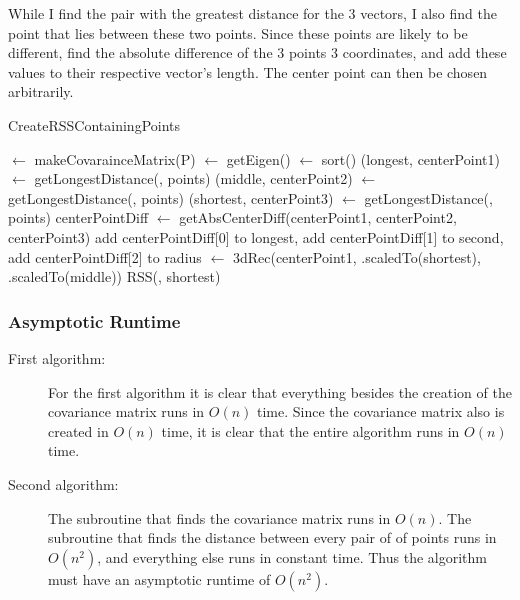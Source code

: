 While I find the pair with the greatest distance for the 3 vectors, I also find the point that lies between these two points. Since these points are likely to be different, find the absolute difference of the 3 points 3 coordinates, and add these values to their respective vector's length. The center point can then be chosen arbitrarily.

\begin{algorithm}[H]
  \caption{CreateRSSContainingPoints}
   
  \dontprintsemicolon
  \covar $\gets$ makeCovarainceMatrix(P)\;
  \eigen $\gets$ getEigen(\covar) \;
  \eigen $\gets$ sort(\eigen) \;
  (longest, centerPoint1) $\gets$ getLongestDistance(\eigen[2], points) \;
  (middle, centerPoint2) $\gets$ getLongestDistance(\eigen[1], points) \;
  (shortest, centerPoint3) $\gets$ getLongestDistance(\eigen[0], points) \;
  centerPointDiff $\gets$ getAbsCenterDiff(centerPoint1, centerPoint2, centerPoint3) \;
  add centerPointDiff[0] to longest, add centerPointDiff[1] to second, add centerPointDiff[2] to radius \;
  \threedeeRec $\gets$ 3dRec(centerPoint1, \eigen[2].scaledTo(shortest), \eigen[1].scaledTo(middle)) \;
  \return RSS(\threedeeRec, shortest) \;
\end{algorithm}

\subsubsection{Asymptotic Runtime}
\begin{description}
\item[First algorithm:] For the first algorithm it is clear that everything besides the creation of the covariance matrix runs in $O(n)$ time. Since the covariance matrix also is created in $O(n)$ time, it is clear that the entire algorithm runs in $O(n)$ time.

\item[Second algorithm:] The subroutine that finds the covariance matrix runs in $O(n)$. The subroutine that finds the distance between every pair of of points runs in $O(n^2)$, and everything else runs in constant time. Thus the algorithm must have an asymptotic runtime of $O(n^2)$.  
\end{description}

